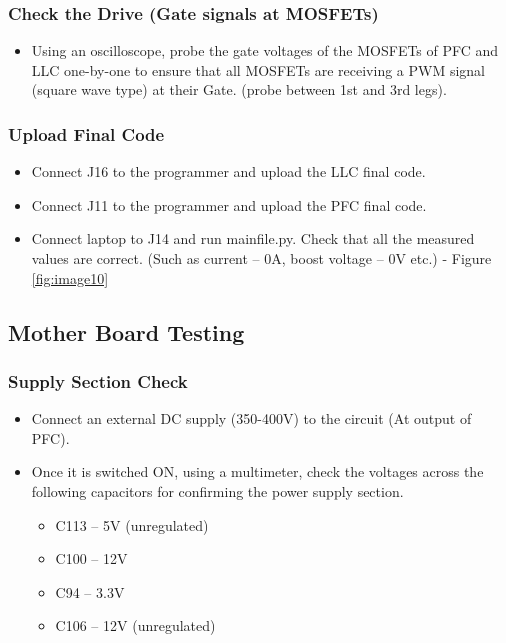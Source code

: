 \subsubsection{Check the Drive (Gate signals at MOSFETs)}
\begin{itemize}
    \item Using an oscilloscope, probe the gate voltages of the MOSFETs of PFC and LLC one-by-one to ensure that all MOSFETs are receiving a PWM signal (square wave type) at their Gate. (probe between 1st and 3rd legs).
\end{itemize}

\subsubsection{Upload Final Code}
\begin{itemize}
    \item Connect J16 to the programmer and upload the LLC final code. 
    \item Connect J11 to the programmer and upload the PFC final code.
    \item Connect laptop to J14 and run mainfile.py. Check that all the measured values are correct. (Such as current – 0A, boost voltage – 0V etc.) - Figure \ref{fig:image10}
\end{itemize}


\subsection{Mother Board Testing}

\subsubsection{Supply Section Check}
\begin{itemize}
    \item Connect an external DC supply (350-400V) to the circuit (At output of PFC).
    \item Once it is switched ON, using a multimeter, check the voltages across the following capacitors for confirming the power supply section.
    \begin{itemize}
        \item C113 – 5V (unregulated)
        \item C100 – 12V
        \item C94 – 3.3V
        \item C106 – 12V (unregulated)  
    \end{itemize}
\end{itemize}

